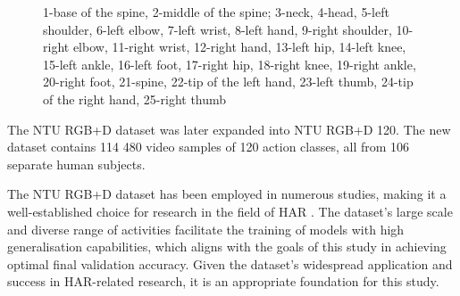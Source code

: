 \begin{figure}
        \caption[Body joints in NTU RGB+D dataset]{1-base of the spine, 2-middle of the spine; 3-neck, 4-head, 5-left shoulder, 6-left elbow, 7-left wrist, 8-left hand, 9-right shoulder, 10-right elbow, 11-right wrist, 12-right hand, 13-left hip, 14-left knee, 15-left ankle, 16-left foot, 17-right hip, 18-right knee, 19-right ankle, 20-right foot, 21-spine, 22-tip of the left hand, 23-left thumb, 24-tip of the right hand, 25-right thumb}
    \label{fig:ntu_body_joints}
\end{figure}


The NTU RGB+D dataset was later expanded into NTU RGB+D 120. The new dataset contains 114 480 video samples of 120 action classes, all from 106 separate human subjects. 

The NTU RGB+D dataset has been employed in numerous studies, making it a well-established choice for research in the field of \gls{HAR} \autocite{yan2018spatial, si2019attention, cheng2020skeleton}. The dataset's large scale and diverse range of activities facilitate the training of models with high generalisation capabilities, which aligns with the goals of this study in achieving optimal final validation accuracy. Given the dataset's widespread application and success in \gls{HAR}-related research, it is an appropriate foundation for this study.